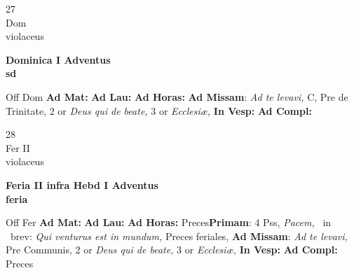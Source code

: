 \documentclass[10pt, openany]{book}
\begin{document}
        \begin{center}
            \begin{minipage}{3.5in}
                \vspace{2em}
                \begin{minipage}{0.5in}
                    {\Huge 27} \\
                    {\normalsize Dom} \\
                    {\normalsize violaceus}
                \end{minipage}
                \begin{minipage}{3.0in}
                    \textbf{ \large Dominica I Adventus \\
                    \textnormal{\normalsize sd}} \\ 
                \end{minipage}
                \begin{justify}Off Dom
                    \textbf{Ad Mat: }
                    \textbf{Ad Lau: }
                    \textbf{Ad Horas: }\textbf{Ad Missam}: \textit{Ad te levavi,} C, Pre de Trinitate, 2 or \textit{Deus qui de beate,} 3 or \textit{Ecclesiæ,}  
                    \textbf{In Vesp: }
                    \textbf{Ad Compl: }
                \end{justify}
            \end{minipage}
        \end{center}
    
        \begin{center}
            \begin{minipage}{3.5in}
                \vspace{2em}
                \begin{minipage}{0.5in}
                    {\Huge 28} \\
                    {\normalsize Fer II} \\
                    {\normalsize violaceus}
                \end{minipage}
                \begin{minipage}{3.0in}
                    \textbf{ \large Feria II infra Hebd I Adventus \\
                    \textnormal{\normalsize feria}} \\ 
                \end{minipage}
                \begin{justify}Off Fer
                    \textbf{Ad Mat: }
                    \textbf{Ad Lau: }
                    \textbf{Ad Horas: }Preces\textbf{Primam}: 4 Pss, \textit{Pacem,} \Vbar\ in \Rbar\ brev: \textit{Qui venturus est in mundum,} Preces feriales, \textbf{Ad Missam}: \textit{Ad te levavi,} Pre Communis, 2 or \textit{Deus qui de beate,} 3 or \textit{Ecclesiæ,}  
                    \textbf{In Vesp: }
                    \textbf{Ad Compl: }Preces
                \end{justify}
            \end{minipage}
        \end{center}
    
\end{document}
